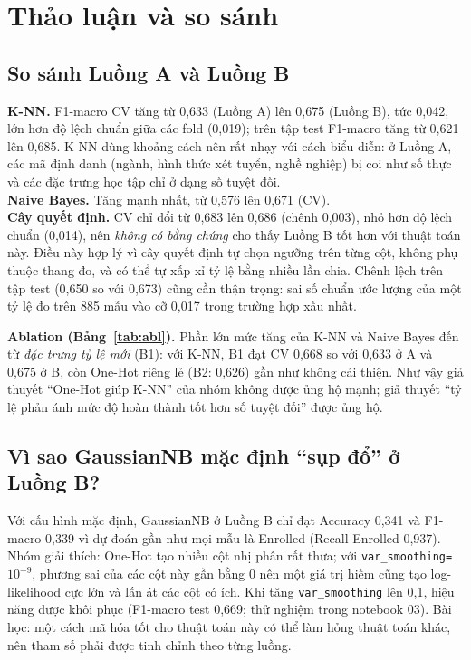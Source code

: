 \documentclass[12pt,a4paper]{article}
\begin{document}
\section{Thảo luận và so sánh}
\subsection{So sánh Luồng A và Luồng B}
\textbf{K-NN.} F1-macro CV tăng từ 0,633 (Luồng A) lên 0,675 (Luồng B), tức 0,042, lớn hơn độ lệch chuẩn giữa các
fold (0,019); trên tập test F1-macro tăng từ 0,621 lên 0,685. K-NN dùng khoảng cách nên rất nhạy với cách biểu diễn:
ở Luồng A, các mã định danh (ngành, hình thức xét tuyển, nghề nghiệp) bị coi như số thực và các đặc trưng học tập chỉ ở dạng số tuyệt đối.\\
\textbf{Naive Bayes.} Tăng mạnh nhất, từ 0,576 lên 0,671 (CV).\\
\textbf{Cây quyết định.} CV chỉ đổi từ 0,683 lên 0,686 (chênh 0,003), nhỏ hơn độ lệch chuẩn (0,014),
nên \emph{không có bằng chứng} cho thấy Luồng B tốt hơn với thuật toán này. Điều này hợp lý vì cây quyết định tự chọn ngưỡng trên từng
cột, không phụ thuộc thang đo, và có thể tự xấp xỉ tỷ lệ bằng nhiều lần chia. Chênh lệch trên tập test (0,650 so với 0,673) cũng
cần thận trọng: sai số chuẩn ước lượng của một tỷ lệ đo trên 885 mẫu vào cỡ 0,017 trong trường hợp xấu nhất.

\textbf{Ablation (Bảng~\ref{tab:abl}).} Phần lớn mức tăng của K-NN và Naive Bayes đến từ \emph{đặc trưng tỷ lệ mới} (B1): với K-NN, B1 đạt
CV 0,668 so với 0,633 ở A và 0,675 ở B, còn One-Hot riêng lẻ (B2: 0,626) gần như không cải thiện. Như vậy
giả thuyết ``One-Hot giúp K-NN'' của nhóm không được ủng hộ mạnh; giả thuyết ``tỷ lệ phản ánh mức độ hoàn thành tốt hơn số tuyệt đối'' được
ủng hộ.

\subsection{Vì sao GaussianNB mặc định ``sụp đổ'' ở Luồng B?}
Với cấu hình mặc định, GaussianNB ở Luồng B chỉ đạt Accuracy 0,341 và F1-macro 0,339 vì dự đoán gần như mọi mẫu là Enrolled
(Recall Enrolled 0,937). Nhóm giải thích: One-Hot tạo nhiều cột nhị phân rất thưa; với \texttt{var\_smoothing=$10^{-9}$}, phương sai của các
cột này gần bằng 0 nên một giá trị hiếm cũng tạo log-likelihood cực lớn và lấn át các cột có ích. Khi tăng \texttt{var\_smoothing} lên 0,1,
hiệu năng được khôi phục (F1-macro test 0,669; thử nghiệm trong notebook 03). Bài học: một cách mã hóa tốt cho thuật toán này có thể làm hỏng thuật
toán khác, nên tham số phải được tinh chỉnh theo từng luồng.
\end{document}
